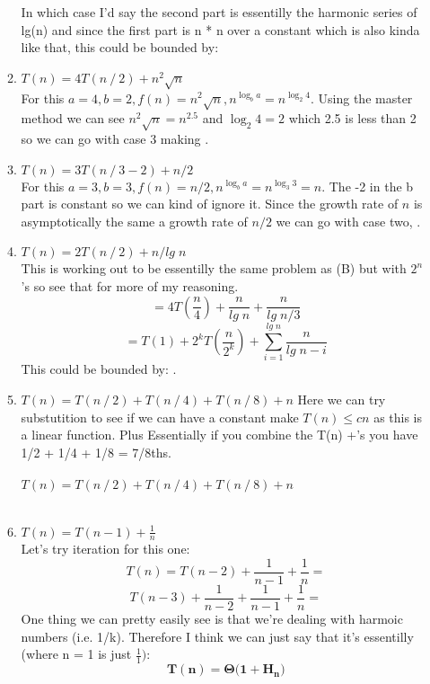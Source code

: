 \documentclass{article}
\begin{document}
\begin{enumerate}
\begin{enumerate}
      In which case I'd say the second part is essentilly the harmonic series of lg(n) and since the first part is n * n over a constant which is also kinda like that, this could be bounded by: 

      \item $T(n) = 4T(n \mathbin{/} 2) + n^2 \sqrt{n}$ \\
      For this $a = 4, b = 2, f(n) = n^2 \sqrt{n}, n^{\log_b a} = n^{\log_2 4}$. 
      Using the master method we can see $n^2 \sqrt{n} = n^{2.5}$ and $\log_2 4 = 2$ 
      which 2.5 is less than 2 so we can go with case 3 making .

      \item $T(n) = 3T(n \mathbin{/} 3 - 2) + n/2$ \\
      For this $a = 3, b = 3, f(n) = n/2, n^{\log_b a} = n^{\log_3 3} = n$. The -2 in the b part is constant so we can kind of ignore it. 
      Since the growth rate of $n$ is asymptotically the same a growth rate of $n/2$ we can go with case two,
      .

      \item $T(n) = 2T(n \mathbin{/} 2) + n/lg\;n$ \\
      This is working out to be essentilly the same problem as (B) but with $2^n$'s so see that for more of my reasoning.
      \[= 4T(\frac{n}{4}) + \frac{n}{lg\;n} + \frac{n}{lg\;n/3}\]
      \[= T(1) + 2^kT(\frac{n}{2^k}) + \sum_{i=1}^{lg\;n}\frac{n}{lg\;n-i}\]
      This could be bounded by: .
      
      \item $T(n) = T(n \mathbin{/} 2) + T(n \mathbin{/} 4) + T(n \mathbin{/} 8) + n$
      Here we can try substutition to see if we can have a constant make $T(n) \leq cn$ as this is a linear function. Plus Essentially if you combine the T(n) +'s you have 1/2 + 1/4 + 1/8 = 7/8ths. \\\\
      $T(n) = T(n \mathbin{/} 2) + T(n \mathbin{/} 4) + T(n \mathbin{/} 8) + n$ \\
       \\ 

      \item $T(n) = T(n - 1) + \frac{1}{n}$ \\
      Let's try iteration for this one: \\
      \[T(n) = T(n - 2) + \frac{1}{n - 1} + \frac{1}{n} = \]
      \[T(n - 3) + \frac{1}{n - 2} + \frac{1}{n - 1} + \frac{1}{n} = \]
      One thing we can pretty easily see is that we're dealing with harmoic numbers (i.e. 1/k). Therefore I think we can just say that it's essentilly (where n = 1 is just $\frac{1}{1})$:
      \[\bm{T(n) = \Theta(1 + H_n})\]


\end{enumerate}
\end{enumerate}
\end{document}

